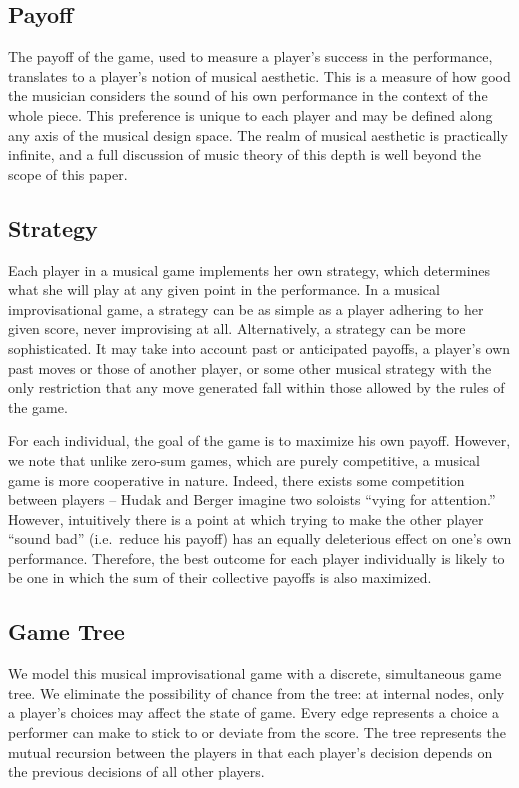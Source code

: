 \documentclass{article}
\begin{document}
\subsection{Payoff}
The payoff of the game, used to measure a player's success in the
performance, translates to a player's notion of musical aesthetic. This
is a measure of how good the musician considers the sound of his own
performance in the context of the whole piece. This preference is
unique to each player and may be defined along any axis of the musical
design space. The realm of musical aesthetic is practically infinite,
and a full discussion of music theory of this depth is well beyond the
scope of this paper.

\subsection{Strategy}
Each player in a musical game implements her own strategy, which
determines what she will play at any given point in the performance. In
a musical improvisational game, a strategy can be as simple as a player
adhering to her given score, never improvising at all.
Alternatively, a strategy can be more sophisticated.  It may take into account
past or anticipated payoffs, a player's own past moves or those of
another player, or some other musical strategy with the only restriction
that any move generated fall within those allowed by the
rules of the game.

For each individual, the goal of the game is to maximize his own
payoff. However, we note that unlike zero-sum games, which are purely
competitive, a musical game is more cooperative in nature. Indeed, there
exists some competition between players -- Hudak and Berger imagine two soloists
``vying for attention.''\cite{hudakberger95}  However, intuitively there is a point at which
trying to make the other player ``sound bad'' (i.e.~reduce his payoff)
has an equally deleterious effect on one's own performance. Therefore,
the best outcome for each player individually is likely to be one in
which the sum of their collective payoffs is also maximized.

\subsection{Game Tree}
We model this musical improvisational game with a discrete, simultaneous
game tree. We eliminate the possibility of chance from the tree: at
internal nodes, only a player's choices may affect the state of game.
Every edge represents a choice a performer can make to stick to or
deviate from the score. The tree represents the mutual recursion between
the players in that each player's decision depends on the previous
decisions of all other players.
\end{document}
